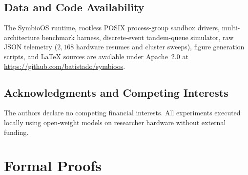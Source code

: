 \documentclass[10pt,journal,compsoc]{IEEEtran}
\theoremstyle{definition}
\theoremstyle{remark}
\newcommand{\SymbioOS}{\textup{\textsc{SymbioOS}}}
\def\SymbioOS{SymbioOS}%
\begin{document}
\subsection*{Data and Code Availability}
The \SymbioOS{} runtime, rootless POSIX process-group sandbox drivers, multi-architecture benchmark harness, discrete-event tandem-queue simulator, raw JSON telemetry ($2{,}168$ hardware resumes and cluster sweeps), figure generation scripts, and LaTeX sources are available under Apache~2.0 at \url{https://github.com/batistado/symbioos}.

\subsection*{Acknowledgments and Competing Interests}
The authors declare no competing financial interests. All experiments executed locally using open-weight models on researcher hardware without external funding.

\appendices
\section{Formal Proofs}\label{app:proofs}
\end{document}
